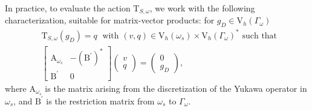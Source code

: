 \documentclass[a4paper,11pt]{article}
\newcommand{\mA}{\mathrm{A}}
\newcommand{\mB}{\mathrm{B}}
\newcommand{\mT}{\mathrm{T}}
\newcommand{\Vh}{\mathrm{V}_{h}}
\begin{document}
In practice, to evaluate the action $\mT_{S,\omega}$, we work 
with the following characterization,
suitable for matrix-vector products: for \(g_D \in \Vh(\Gamma_{\omega})\)
\begin{equation}\label{eq:schur_def}
\begin{aligned}
  & \mT_{S,\omega}(g_D) = q  \; \text{ with } (v, q) \in \Vh(\omega_s) \times \Vh(\Gamma_{\omega})^* \text{ such that }\\
  & \begin{bmatrix}
    \mA_{\omega_s} & - (\mB^{'})^*\\
    \mB^{'} & 0
  \end{bmatrix}
  \begin{pmatrix}
    v \\
    q
  \end{pmatrix}
  = 
  \begin{pmatrix}
    0 \\
    g_D
  \end{pmatrix},
\end{aligned}
\end{equation}
where \(\mA_{\omega_s}\) is the matrix arising from the discretization of
the Yukawa operator in \(\omega_s\), and \(\mB^{'}\) is the restriction
matrix from \(\omega_s\) to \(\Gamma_{\omega}\). 
\end{document}
